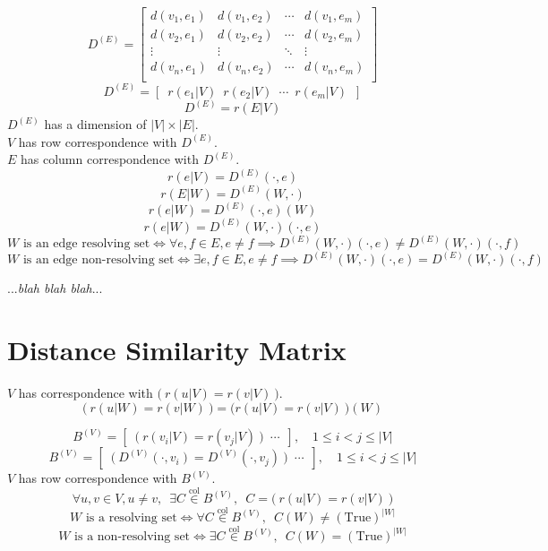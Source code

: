 \documentclass{article}
\begin{document}
	\[
		D^{(E)} = \left[
		\begin{array}{cccc}
			d(v_1, e_1) & d(v_1, e_2) & \cdots & d(v_1, e_m) \\
			d(v_2, e_1) & d(v_2, e_2) & \cdots & d(v_2, e_m) \\
			\vdots & \vdots & \ddots & \vdots \\
			d(v_n, e_1) & d(v_n, e_2) & \cdots & d(v_n, e_m) \\
		\end{array}
		\right]
	\]
	\[ D^{(E)} = \left[\enspace r(e_1|V)\enspace r(e_2|V)\enspace \cdots\enspace r(e_m|V)\enspace \right] \]
	\[ D^{(E)} = r(E|V) \]
	\(D^{(E)}\) has a dimension of \(|V| \times |E|\). \\
	\(V\) has row correspondence with \(D^{(E)}\). \\
	\(E\) has column correspondence with \(D^{(E)}\).
	\[ r(e|V) = D^{(E)}(\cdot, e) \]
	\[ r(E|W) = D^{(E)}(W, \cdot) \]
	\[ r(e|W) = D^{(E)}(\cdot, e)(W) \]
	\[ r(e|W) = D^{(E)}(W, \cdot)(\cdot, e) \]
	\[ W \text{ is an edge resolving set} \iff \forall e, f \in E, e \neq f \implies D^{(E)}(W, \cdot)(\cdot, e) \neq D^{(E)}(W, \cdot)(\cdot, f) \]
	\[ W \text{ is an edge non-resolving set} \iff \exists e, f \in E, e \neq f \implies D^{(E)}(W, \cdot)(\cdot, e) = D^{(E)}(W, \cdot)(\cdot, f) \]

	...\textit{blah blah blah}...

	\clearpage
	\section{Distance Similarity Matrix}

	\(V\) has correspondence with \(\bm{(}\ r(u|V) = r(v|V)\ \bm{)}\).
	\[ \bm{(}\ r(u|W) = r(v|W)\ \bm{)} = \bm{(} r(u|V) = r(v|V)\ \bm{)}(W) \]

	\[ B^{(V)} = \left[\enspace \bm{(}\ r(v_i|V) = r(v_j|V)\ \bm{)}\enspace \cdots\enspace \right],\quad 1 \leq i < j \leq |V| \]
	\[ B^{(V)} = \left[\enspace \bm{(}\ D^{(V)}(\cdot, v_i) = D^{(V)}(\cdot, v_j)\ \bm{)} \enspace \cdots\enspace \right],\quad 1 \leq i < j \leq |V| \]
	\(V\) has row correspondence with \(B^{(V)}\).
	\[ \forall u, v \in V, u \neq v,\enspace \exists C \overset{\text{col}}{\in} B^{(V)},\enspace C = \bm{(}\ r(u|V) = r(v|V)\ \bm{)} \]
	\[ W \text{ is a resolving set} \iff \forall C \overset{\text{col}}{\in} B^{(V)},\enspace C(W) \neq (\mathrm{True})^{|W|} \]
	\[ W \text{ is a non-resolving set} \iff \exists C \overset{\text{col}}{\in} B^{(V)},\enspace C(W) = (\mathrm{True})^{|W|} \]
\end{document}
